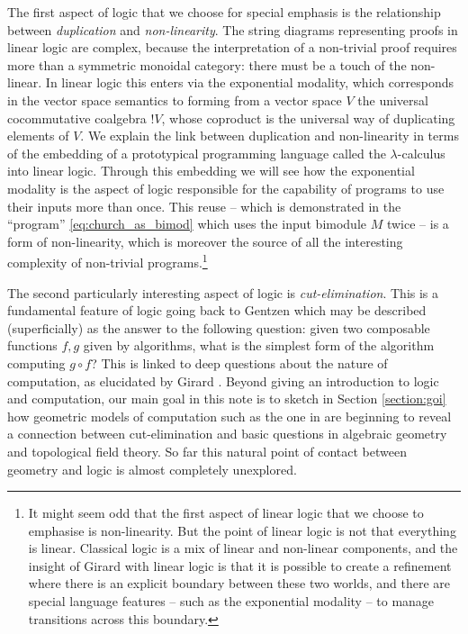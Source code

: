 \documentclass[english,letter paper,12pt,reqno]{article}
\theoremstyle{example}
\numberwithin{equation}{section}
\begin{document}
The first aspect of logic that we choose for special emphasis is the relationship between \emph{duplication} and \emph{non-linearity}. The string diagrams representing proofs in linear logic are complex, because the interpretation of a non-trivial proof requires more than a symmetric monoidal category: there must be a touch of the non-linear. In linear logic this enters via the exponential modality, which corresponds in the vector space semantics to forming from a vector space $V$ the universal cocommutative coalgebra ${!}V$, whose coproduct is the universal way of duplicating elements of $V$. We explain the link between duplication and non-linearity in terms of the embedding of a prototypical programming language called the $\lambda$-calculus into linear logic. Through this embedding we will see how the exponential modality is the aspect of logic responsible for the capability of programs to use their inputs more than once. This reuse -- which is demonstrated in the ``program'' \eqref{eq:church_as_bimod} which uses the input bimodule $M$ twice -- is a form of non-linearity, which is moreover the source of all the interesting complexity of non-trivial programs.\footnote{It might seem odd that the first aspect of linear logic that we choose to emphasise is non-linearity. But the point of linear logic is not that everything is linear. Classical logic is a mix of linear and non-linear components, and the insight of Girard with linear logic is that it is possible to create a refinement where there is an explicit boundary between these two worlds, and there are special language features -- such as the exponential modality -- to manage transitions across this boundary.}

The second particularly interesting aspect of logic is \emph{cut-elimination}. This is a fundamental feature of logic going back to Gentzen \cite{gentzen} which may be described (superficially) as the answer to the following question: given two composable functions $f,g$ given by algorithms, what is the simplest form of the algorithm computing $g \circ f$? This is linked to deep questions about the nature of computation, as elucidated by Girard \cite{girard_towards}. Beyond giving an introduction to logic and computation, our main goal in this note is to sketch in Section \ref{section:goi} how geometric models of computation such as the one in \cite{murfet} are beginning to reveal a connection between cut-elimination and basic questions in algebraic geometry and topological field theory. So far this natural point of contact between geometry and logic is almost completely unexplored.
\\
\end{document}
